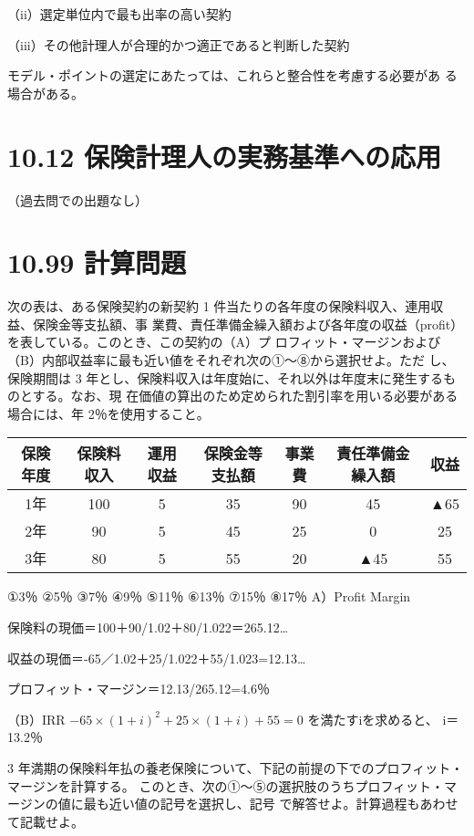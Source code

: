 \documentclass[report,gutter=10mm,fore-edge=10mm,uplatex,dvipdfmx]{jlreq}
\begin{document}
（ii）選定単位内で最も出率の高い契約

（iii）その他計理人が合理的かつ適正であると判断した契約

モデル・ポイントの選定にあたっては、これらと整合性を考慮する必要があ
る場合がある。



\section{10.12 保険計理人の実務基準への応用}
（過去問での出題なし）

\section{10.99 計算問題}
次の表は、ある保険契約の新契約 1 件当たりの各年度の保険料収入、連用収益、保険金等支払額、事
業費、責任準備金繰入額および各年度の収益（profit）を表している。このとき、この契約の（A）プ
ロフィット・マージンおよび（B）内部収益率に最も近い値をそれぞれ次の①～⑧から選択せよ。ただ
し、保険期間は 3 年とし、保険料収入は年度始に、それ以外は年度末に発生するものとする。なお、現
在価値の算出のため定められた割引率を用いる必要がある場合には、年 2％を使用すること。

\begin{tabular}{|c|c|c|c|c|c|c|}
\hline
 保険年度&保険料収入& 運用収益&保険金等支払額&事業費&責任準備金繰入額&収益\\ \hline
 1年& 100&5 &35 &90 &45&▲65 \\ \hline
 2年& 90&5 &45 &25& 0&25 \\ \hline
 3年& 80&5 &55 &20&▲45&55 \\ \hline
\end{tabular}

①3％ ②5％ ③7％ ④9％ ⑤11％ ⑥13％ ⑦15％ ⑧17％
\answer{}
A）Profit Margin

保険料の現価＝100＋90/1.02＋80/1.022＝265.12…

収益の現価＝-65／1.02＋25/1.022＋55/1.023=12.13…

プロフィット・マージン＝12.13/265.12=4.6％

（B）IRR
$-65\times(1+i)^2+25\times(1+i)+55=0$ を満たすiを求めると、
i＝13.2％

3 年満期の保険料年払の養老保険について、下記の前提の下でのプロフィット・マージンを計算する。
このとき、次の①～⑤の選択肢のうちプロフィット・マージンの値に最も近い値の記号を選択し、記号
で解答せよ。計算過程もあわせて記載せよ。
\end{document}
